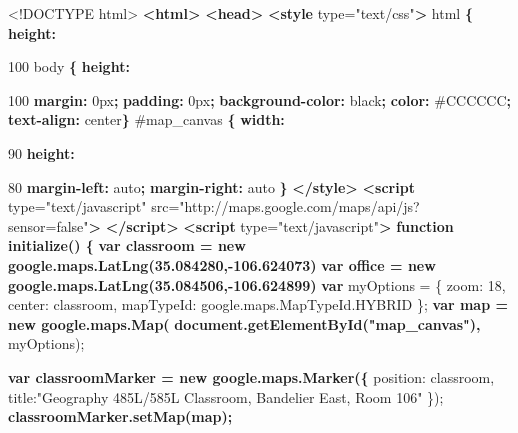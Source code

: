 \documentclass[]{article}
\newenvironment{Shaded}{}{}
\newcommand{\KeywordTok}[1]{\textcolor[rgb]{0.00,0.44,0.13}{\textbf{{#1}}}}
\newcommand{\DataTypeTok}[1]{\textcolor[rgb]{0.56,0.13,0.00}{{#1}}}
\newcommand{\DecValTok}[1]{\textcolor[rgb]{0.25,0.63,0.44}{{#1}}}
\newcommand{\FloatTok}[1]{\textcolor[rgb]{0.25,0.63,0.44}{{#1}}}
\newcommand{\StringTok}[1]{\textcolor[rgb]{0.25,0.44,0.63}{{#1}}}
\newcommand{\OtherTok}[1]{\textcolor[rgb]{0.00,0.44,0.13}{{#1}}}
\newcommand{\FunctionTok}[1]{\textcolor[rgb]{0.02,0.16,0.49}{{#1}}}
\newcommand{\ErrorTok}[1]{\textcolor[rgb]{1.00,0.00,0.00}{\textbf{{#1}}}}
\newcommand{\NormalTok}[1]{{#1}}
\begin{document}
\begin{Shaded}
\begin{Highlighting}[numbers=left,,]
\DataTypeTok{<!DOCTYPE }\NormalTok{html}\DataTypeTok{>}
\KeywordTok{<html>}
    \KeywordTok{<head>}
        \KeywordTok{<style}\OtherTok{ type=}\StringTok{"text/css"}\KeywordTok{>}
          \NormalTok{html }\KeywordTok{\{} \KeywordTok{height:} \DataTypeTok{100%
          \NormalTok{body }\KeywordTok{\{} \KeywordTok{height:} \DataTypeTok{100%
            \KeywordTok{margin:} \DataTypeTok{0px}\KeywordTok{;} 
            \KeywordTok{padding:} \DataTypeTok{0px}\KeywordTok{;} 
            \KeywordTok{background-color:} \DataTypeTok{black}\KeywordTok{;} 
            \KeywordTok{color:} \DataTypeTok{#CCCCCC}\KeywordTok{;}
            \KeywordTok{text-align:} \DataTypeTok{center}\KeywordTok{\}}
          \FloatTok{#map_canvas} \KeywordTok{\{} \KeywordTok{width:}\DataTypeTok{90%
            \KeywordTok{height:}\DataTypeTok{80%
            \KeywordTok{margin-left:} 
            \DataTypeTok{auto}\KeywordTok{;} 
            \KeywordTok{margin-right:} \DataTypeTok{auto} \KeywordTok{\}}
        \KeywordTok{</style>}
        \KeywordTok{<script}\OtherTok{ type=}\StringTok{"text/javascript"}
\OtherTok{            src=}\StringTok{"http://maps.google.com/maps/api/js?sensor=false"}\KeywordTok{>}
        \KeywordTok{</script>}
        \KeywordTok{<script}\OtherTok{ type=}\StringTok{"text/javascript"}\KeywordTok{>}
\ErrorTok{          function initialize() \{}
\ErrorTok{            var classroom = new google.maps.LatLng(35.084280,-106.624073)}
\ErrorTok{            var office = new google.maps.LatLng(35.084506,-106.624899)}
            \KeywordTok{var} \NormalTok{myOptions = \{}
              \DataTypeTok{zoom}\NormalTok{: }\DecValTok{18}\NormalTok{,}
              \DataTypeTok{center}\NormalTok{: classroom,}
              \DataTypeTok{mapTypeId}\NormalTok{: }\OtherTok{google}\NormalTok{.}\OtherTok{maps}\NormalTok{.}\OtherTok{MapTypeId}\NormalTok{.}\FunctionTok{HYBRID}
              \NormalTok{\};}
\ErrorTok{            var map = new google.maps.Map(}
\ErrorTok{              document.getElementById("map_canvas"), }
              \NormalTok{myOptions);}
        
\ErrorTok{            var classroomMarker = new google.maps.Marker(\{}
              \NormalTok{position: classroom,}
              \NormalTok{title:}\StringTok{"Geography 485L/585L Classroom, Bandelier East, Room 106"}
              \NormalTok{\});}
\ErrorTok{            classroomMarker.setMap(map);}
        
}}}}
\end{Highlighting}
\end{Shaded}
\end{document}
